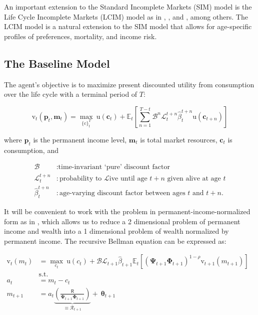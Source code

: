 \documentclass{article}
\newcommand{\DiscFac}{\beta}
\newcommand{\cFunc}{\mathrm{c}}
\newcommand{\uFunc}{\mathrm{u}}
\newcommand{\vFunc}{\mathrm{v}}
\newcommand{\Alive}{\mathcal{L}}
\newcommand{\cLvl}{\mathbf{c}}
\newcommand{\mLvl}{\mathbf{m}}
\newcommand{\pLvl}{\mathbf{p}}
\newcommand{\Ex}{\mathbb{E}}
\newcommand{\beth}{\mathcal{B}}
\newcommand{\CRRA}{\rho}
\newcommand{\PermGroFac}{\pmb{\Phi}}
\newcommand{\Rfree}{\mathsf{R}}
\newcommand{\PermShk}{\mathbf{\Psi}}
\newcommand{\aNrm}{a}
\newcommand{\cNrm}{c}
\newcommand{\RNrm}{\mathcal{R}}
\newcommand{\TranShkEmp}{\pmb{\theta}}
\begin{document}
An important extension to the Standard Incomplete Markets (SIM) model is the Life Cycle Incomplete Markets (LCIM) model as in \cite{Cagetti_2003}, \cite{Gourinchas_2002}, and \cite{Palumbo_1999}, among others. The LCIM model is a natural extension to the SIM model that allows for age-specific profiles of preferences, mortality, and income risk.

\subsection{The Baseline Model}\label{The Baseline Model}

The agent's objective is to maximize present discounted utility from consumption over the life cycle with a terminal period of $T$:

\begin{equation}
\label{eq:lifecyclemax}
\vFunc_{t}(\pLvl_{t},\mLvl_{t})  =    \max_{\{\cFunc\}_{t}^{T}} ~ \uFunc(\cLvl_{t})+\Ex_{t}\left[\sum_{n=1}^{T-t} {\beth}^{n} \Alive_{t}^{t+n}\hat{\DiscFac}_{t}^{t+n} \uFunc(\cLvl_{t+n}) \right]
\end{equation}

where $\pLvl_{t}$ is the permanent income level, $\mLvl_{t}$ is total market resources, $\cLvl_{t}$ is consumption, and

\begin{equation}
\begin{align}
    \beth & :  \text{time-invariant `pure' discount factor}
    \\ \Alive _{t}^{t+n} & :  \text{probability to }\Alive\text{ive until age $t+n$ given alive at age $t$}
    \\ \hat{\DiscFac}_{t}^{t+n} & :  \text{age-varying discount factor between ages $t$ and $t+n$.}
\end{align}
\end{equation}

It will be convenient to work with the problem in permanent-income-normalized form as in \cite{Carroll_2004}, which allows us to reduce a 2 dimensional problem of permanent income and wealth into a 1 dimensional problem of wealth normalized by permanent income. The recursive Bellman equation can be expressed as:

\begin{equation}
\begin{align}
    {\vFunc}_{t}({m}_{t}) & = \max_{\cNrm_{t}} ~ \uFunc(\cNrm_{t})+\beth\Alive_{t+1}\hat{\DiscFac}_{t+1}
    \Ex_{t}[(\PermShk_{t+1}\PermGroFac_{t+1})^{1-\CRRA}{\vFunc}_{t+1}({m}_{t+1})]
    \\ & \text{s.t.} & \nonumber
    \\ \aNrm_{t} & = {m}_{t}-\cNrm_{t} \nonumber
    \\ {m}_{t+1} & = \aNrm_{t}\underbrace{\left(\frac{\Rfree}{\PermShk_{t+1}\PermGroFac_{t+1}}\right)}_{\equiv \RNrm_{t+1}}
    + ~\TranShkEmp_{t+1}
\end{align}
\end{equation}
\end{document}
